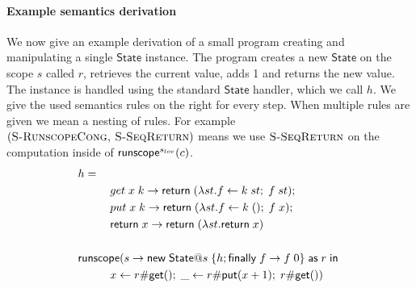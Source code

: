 {\paragraph{Example semantics derivation}
We now give an example derivation of a small program creating and manipulating a single $\mathsf{State}$ instance.
The program creates a new $\mathsf{State}$ on the scope $s$ called $r$, retrieves the current value, adds 1 and returns the new value. The instance is handled using the standard $\mathsf{State}$ handler, which we call $h$.
We give the used semantics rules on the right for every step.
When multiple rules are given we mean a nesting of rules.
For example $(\textsc{S-RunscopeCong, S-SeqReturn})$ means we use $\textsc{S-SeqReturn}$ on the computation inside of $\mathsf{runscope}^{s_{loc}} ( c )$.
\begin{align*}
& h = \\
	&\hspace{1cm} get \; x \; k \rightarrow \mathsf{return} \; (\lambda st . f \leftarrow k \; st ;\; f \; st) ; \\
	&\hspace{1cm} put \; x \; k \rightarrow \mathsf{return} \; (\lambda st . f \leftarrow k \; () ;\; f \; x) ; \\
	&\hspace{1cm} \mathsf{return} \; x \rightarrow \mathsf{return} \; (\lambda st . \mathsf{return} \; x) \\
\\
&\mathsf{runscope} ( s \rightarrow \mathsf{new} \; \mathsf{State} @ s \; \{ h ; \mathsf{finally} \; f \rightarrow f \; 0 \} \; \mathsf{as} \; r \;\mathsf{in}\; \\
	&\hspace{1cm} x \leftarrow r \# \mathsf{get}() ;\; \_ \leftarrow r \# \mathsf{put}(x + 1) ;\; r \# \mathsf{get}() ) \\
\end{align*}

}
